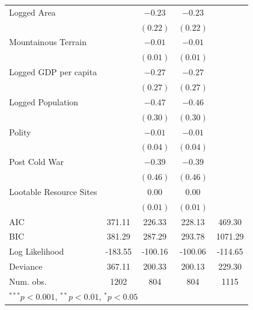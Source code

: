 \documentclass[12pt,]{book}
\let\origtable\table
\let\endorigtable\endtable
\renewenvironment{table}[1][2] {
    \singlespacing
    \expandafter\origtable\expandafter[H]
} {
    \endorigtable
}
\theoremstyle{definition}
\theoremstyle{definition}
\theoremstyle{definition}
\theoremstyle{remark}
\begin{document}
\begin{table}
\begin{center}
\begin{tabular}{l c c c c }
Logged Area                       &               & $-0.23$      & $-0.23$     &              \\
                                  &               & $(0.22)$     & $(0.22)$    &              \\
Mountainous Terrain               &               & $-0.01$      & $-0.01$     &              \\
                                  &               & $(0.01)$     & $(0.01)$    &              \\
Logged GDP per capita             &               & $-0.27$      & $-0.27$     &              \\
                                  &               & $(0.27)$     & $(0.27)$    &              \\
Logged Population                 &               & $-0.47$      & $-0.46$     &              \\
                                  &               & $(0.30)$     & $(0.30)$    &              \\
Polity                            &               & $-0.01$      & $-0.01$     &              \\
                                  &               & $(0.04)$     & $(0.04)$    &              \\
Post Cold War                     &               & $-0.39$      & $-0.39$     &              \\
                                  &               & $(0.46)$     & $(0.46)$    &              \\
Lootable Resource Sites           &               & $0.00$       & $0.00$      &              \\
                                  &               & $(0.01)$     & $(0.01)$    &              \\
\hline
AIC                               & 371.11        & 226.33       & 228.13      & 469.30       \\
BIC                               & 381.29        & 287.29       & 293.78      & 1071.29      \\
Log Likelihood                    & -183.55       & -100.16      & -100.06     & -114.65      \\
Deviance                          & 367.11        & 200.33       & 200.13      & 229.30       \\
Num. obs.                         & 1202          & 804          & 804         & 1115         \\
\hline
\multicolumn{5}{l}{\scriptsize{$^{***}p<0.001$, $^{**}p<0.01$, $^*p<0.05$}}
\end{tabular}
\caption{Logit Models of Rebel Group Formation (Conflict-Years with < 1000 Fatalities)}
\label{tab:entry-conflict}
\end{center}
\end{table}
\end{document}
